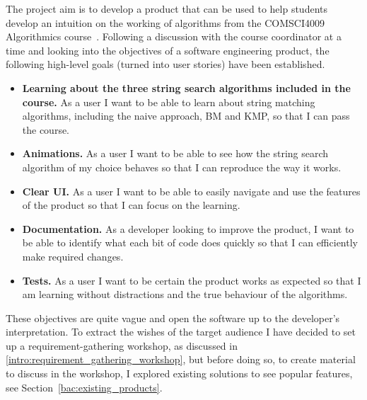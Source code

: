 The project aim is to develop a product that can be used to help students develop an intuition on the working of algorithms from the COMSCI4009 Algorithmics  course~\cite{algorithmics_1}. Following a discussion with the course coordinator at a time and looking into the objectives of a software engineering product, the following high-level goals (turned into user stories) have been established.
\begin{itemize}
  \item \textbf{Learning about the three string search algorithms included in the course.} As a user I want to be able to learn about string matching algorithms, including the naive approach, BM and KMP, so that I can pass the course.  
  \item \textbf{Animations.} As a user I want to be able to see how the string search algorithm of my choice behaves so that I can reproduce the way it works.
  \item \textbf{Clear UI.} As a user I want to be able to easily navigate and use the features of the product so that I can focus on the learning.
  \item \textbf{Documentation.} As a developer looking to improve the product, I want to be able to identify what each bit of code does quickly so that I can efficiently make required changes.
  \item \textbf{Tests.} As a user I want to be certain the product works as expected so that I am learning without distractions and the true behaviour of the algorithms.
\end{itemize}

These objectives are quite vague and open the software up to the developer's interpretation. To extract the wishes of the target audience I have decided to set up a requirement-gathering workshop, as discussed in \ref{intro:requirement_gathering_workshop}, but before doing so, to create material to discuss in the workshop, I explored existing solutions to see popular features, see Section~\ref{bac:existing_products}.




